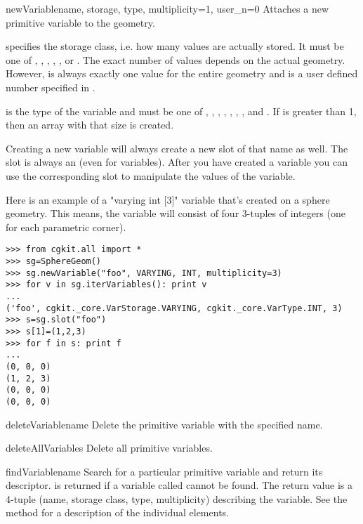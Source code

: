 \begin{methoddesc}{newVariable}{name, storage, type, multiplicity=1, user_n=0}
Attaches a new primitive variable to the geometry.

 specifies the storage
class, i.e. how many values are actually stored. It must be one of
, , , , 
,  or
. The exact number of values depends on the actual geometry.
However,  is always exactly one value for the entire
geometry and  is a user defined number specified in .

 is the type of the variable and must be one of 
, , , , , 
, ,  and . 
If  is greater than 1, then an array with that size is
created. 

Creating a new variable will always create a new slot of that name as well.
The slot is always an  (even for  variables).
After you have created a variable you can use the corresponding slot to
manipulate the values of the variable.

Here is an example of a "varying int [3]" variable that's created on a sphere 
geometry. This means, the variable will consist of four 3-tuples of integers
(one for each parametric corner).

\begin{verbatim}
>>> from cgkit.all import *
>>> sg=SphereGeom()
>>> sg.newVariable("foo", VARYING, INT, multiplicity=3)
>>> for v in sg.iterVariables(): print v
...
('foo', cgkit._core.VarStorage.VARYING, cgkit._core.VarType.INT, 3)
>>> s=sg.slot("foo")
>>> s[1]=(1,2,3)
>>> for f in s: print f
...
(0, 0, 0)
(1, 2, 3)
(0, 0, 0)
(0, 0, 0)
\end{verbatim}
\end{methoddesc}

\begin{methoddesc}{deleteVariable}{name}
Delete the primitive variable with the specified name.
\end{methoddesc}

\begin{methoddesc}{deleteAllVariables}{}
Delete all primitive variables.
\end{methoddesc}

\begin{methoddesc}{findVariable}{name}
Search for a particular primitive variable and return its descriptor.
 is returned if a variable called  cannot be found.
The return value is a 4-tuple (name, storage class, type, multiplicity)
describing the variable. See the  method for a
description of the individual elements.
\end{methoddesc}

